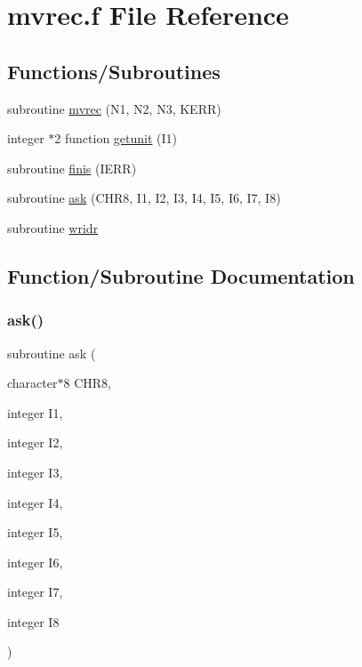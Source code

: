 \hypertarget{mvrec_8f}{}\section{mvrec.\+f File Reference}
\label{mvrec_8f}
\subsection*{Functions/\+Subroutines}
\begin{DoxyCompactItemize}
\item 
subroutine \hyperlink{mvrec_8f_a0803c04e9b4764ac3f1966994ef63e26}{mvrec} (N1, N2, N3, K\+E\+RR)
\item 
integer $\ast$2 function \hyperlink{mvrec_8f_a797694779b864502c8bdc294d52eddb8}{getunit} (I1)
\item 
subroutine \hyperlink{mvrec_8f_ac2413c6bd75bfab4324833e460b06c3a}{finis} (I\+E\+RR)
\item 
subroutine \hyperlink{mvrec_8f_a0306c5354b70dd5ae9a52d954c51be8b}{ask} (C\+H\+R8, I1, I2, I3, I4, I5, I6, I7, I8)
\item 
subroutine \hyperlink{mvrec_8f_a1612710cecd3e00690ea04a54fc79763}{wridr}
\end{DoxyCompactItemize}


\subsection{Function/\+Subroutine Documentation}
\mbox{\label{mvrec_8f_a0306c5354b70dd5ae9a52d954c51be8b}} 
\subsubsection{\texorpdfstring{ask()}{ask()}}
{\footnotesize\ttfamily subroutine ask (\begin{DoxyParamCaption}\item[{character$\ast$8}]{C\+H\+R8,  }\item[{integer}]{I1,  }\item[{integer}]{I2,  }\item[{integer}]{I3,  }\item[{integer}]{I4,  }\item[{integer}]{I5,  }\item[{integer}]{I6,  }\item[{integer}]{I7,  }\item[{integer}]{I8 }\end{DoxyParamCaption})}



